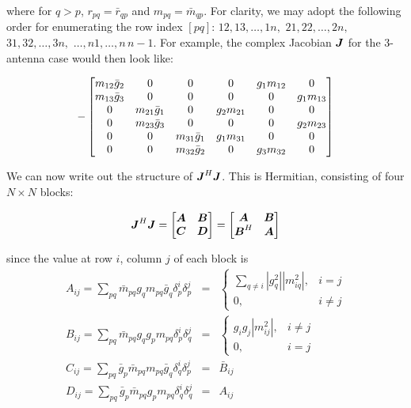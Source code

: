 \documentclass[useAMS,usenatbib]{mn2e}
\newcommand{\mat}[1]{{\bmath{#1}}}
\newcommand{\JJ}{\mat{J}} %
\begin{document}
where for $q>p$, $r_{pq}=\bar{r}_{qp}$ and $m_{pq}=\bar{m}_{qp}$. For clarity, we may adopt the 
following order for enumerating the row index $[pq]$: $12,13,\dots,1n,$ $21,22,\dots,2n,$ $31,32,\dots,3n,$ $\dots,n1,\dots,n\,n-1$. 
For example, the complex Jacobian $\JJ$ for the 3-antenna case would then look like:

\[
-\Matrix{cccccc}{
  m_{12}\bar{g}_2 & 0               & 0 &  0          & g_1 m_{12} & 0           \\
  m_{13}\bar{g}_3 & 0               & 0 &  0          & 0          & g_1 m_{13}  \\
  0               & m_{21}\bar{g}_1 & 0 &  g_2 m_{21} & 0          & 0  \\
  0               & m_{23}\bar{g}_3 & 0 &  0          & 0          & g_2 m_{23} \\
  0               & 0               & m_{31}\bar{g}_1 & g_1 m_{31} & 0          & 0  \\
  0               & 0               & m_{32}\bar{g}_2 & 0 & g_3 m_{32} & 0 \\
}
\]


We can now write out the structure of $\JJ^H\JJ$. This is Hermitian, consisting of four $N\times N$ blocks:

\[
\JJ^H\JJ = \Matrix{cc}{\mat{A}&\mat{B}\\\mat{C}&\mat{D}} = \Matrix{cc}{\mat{A}&\mat{B}\\\mat{B}^H&\mat{A}}
\]

since the value at row $i$, column $j$ of each block is
\begin{eqnarray}
A_{ij} = \sum_{pq} \bar{m}_{pq} g_q m_{pq} \bar{g}_q \delta^{i}_p \delta^{j}_p &=& 
  \left \{ \begin{array}{cc}
        \sum_{q\ne i} |g_{q}^2| |m_{iq}^2|, & i=j \\
        0, & i\ne j
  \end{array} \right .\nonumber\\ 
B_{ij} = \sum_{pq} \bar{m}_{pq} g_q g_p m_{pq} \delta^{i}_p \delta^{j}_q &=& 
  \left \{ \begin{array}{cc}
      g_{i} g_{j} |m_{ij}^2|, & i\ne j\\
      0, & i=j
  \end{array} \right .\nonumber\\ 
C_{ij} = \sum_{pq} \bar{g}_p \bar{m}_{pq} m_{pq} \bar{g}_q \delta^{i}_q \delta^{j}_p &=& 
  \bar{B}_{ij} \nonumber\\
D_{ij} = \sum_{pq} \bar{g}_p \bar{m}_{pq} g_p m_{pq} \delta^{i}_q \delta^{j}_q &=& A_{ij} 
\label{eq:JHJ:DI:ABCD}
\end{eqnarray}
\end{document}
